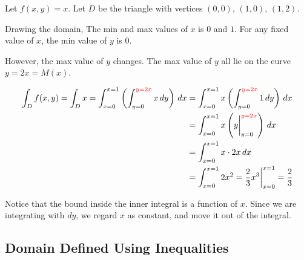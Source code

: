 \documentclass[11pt,fleqn]{book} %
\begin{document}
\begin{example}
    Let $f(x, y) = x$. Let $D$ be the triangle with vertices $(0, 0)$, $(1, 0)$, $(1, 2)$.

    Drawing the domain, The min and max values of $x$ is $0$ and $1$. For any fixed value of $x$, the min value of $y$ is $0$.

    However, the max value of $y$ changes. The max value of $y$ all lie on the curve $y = 2x = M(x)$.
    
    \begin{center}
    \end{center}
    \begin{align*}
        \int_D f(x,y)   = \int_D x
                        = \int_{x=0}^{x=1} \left( \int_{y=0}^{{\color{red}y=2x}} x \,dy \right) \,dx
                      & = \int_{x=0}^{x=1} x \left( \int_{y=0}^{{\color{red}y=2x}} 1 \,dy \right) \,dx \\
                      & = \int_{x=0}^{x=1} x \left( y \bigg|_{y=0}^{{\color{red}y=2x}} \right) \,dx    \\
                      & = \int_{x=0}^{x=1} x \cdot 2x \,dx                                             \\
                      & = \int_{x=0}^{x=1} 2x^2
                        = \frac{2}{3} x^3 \bigg|_{x=0}^{x=1}
                        = \frac{2}{3}
    \end{align*}

    Notice that the bound inside the inner integral is a function of $x$. Since we are integrating with $dy$, we regard $x$ as constant, and move it out of the integral.
\end{example}

\subsection*{Domain Defined Using Inequalities}
\end{document}
